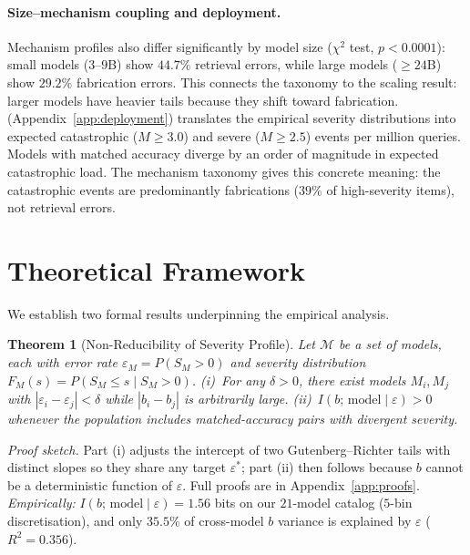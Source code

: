 \documentclass{article}
\newcommand{\sdi}{\ensuremath{b}}
\begin{document}
\paragraph{Size--mechanism coupling and deployment.}\label{sec:deployment}
Mechanism profiles also differ significantly by model size
($\chi^2$ test, $p < 0.0001$): small models ($3$--$9$B) show
$44.7\%$ retrieval errors, while large models ($\geq 24$B) show
$29.2\%$ fabrication errors. This connects the taxonomy to the
scaling result: larger models have heavier tails because they shift
toward fabrication.
 (Appendix~\ref{app:deployment}) translates the
empirical severity distributions into expected catastrophic
($M \geq 3.0$) and severe ($M \geq 2.5$) events per million
queries. Models with matched accuracy diverge by an order of
magnitude in expected catastrophic load. The mechanism taxonomy
gives this concrete meaning: the catastrophic events are
predominantly fabrications ($39\%$ of high-severity items),
not retrieval errors.

\section{Theoretical Framework}\label{sec:theory}

We establish two formal results underpinning the empirical analysis.

\newtheorem{theorem}{Theorem}
\newtheorem{proposition}[theorem]{Proposition}

\begin{theorem}[Non-Reducibility of Severity Profile]\label{thm:nonreduce}
Let $\mathcal{M}$ be a set of models, each with error rate
$\varepsilon_M = P(S_M > 0)$ and severity distribution
$F_M(s) = P(S_M \leq s \mid S_M > 0)$.
(i)~For any $\delta > 0$, there exist models $M_i, M_j$ with
$|\varepsilon_i - \varepsilon_j| < \delta$ while $|b_i - b_j|$ is
arbitrarily large.
(ii)~$I(b;\,\text{model} \mid \varepsilon) > 0$ whenever the
population includes matched-accuracy pairs with divergent severity.
\end{theorem}

\emph{Proof sketch.} Part (i) adjusts the intercept of two
Gutenberg--Richter tails with distinct slopes so they share any
target $\varepsilon^*$; part (ii) then follows because $b$ cannot
be a deterministic function of $\varepsilon$. Full proofs are in
Appendix~\ref{app:proofs}. \emph{Empirically:}
$I(b;\,\text{model} \mid \varepsilon) = 1.56$ bits on our $21$-model
catalog ($5$-bin discretisation), and only $35.5\%$ of cross-model
\sdi{} variance is explained by $\varepsilon$ ($R^2 = 0.356$).
\end{document}
